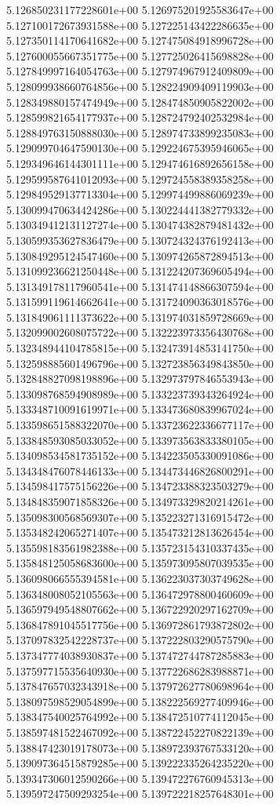 5.126850231177228601e+00
5.126975201925583647e+00
5.127100172673931588e+00
5.127225143422286635e+00
5.127350114170641682e+00
5.127475084918996728e+00
5.127600055667351775e+00
5.127725026415698828e+00
5.127849997164054763e+00
5.127974967912409809e+00
5.128099938660764856e+00
5.128224909409119903e+00
5.128349880157474949e+00
5.128474850905822002e+00
5.128599821654177937e+00
5.128724792402532984e+00
5.128849763150888030e+00
5.128974733899235083e+00
5.129099704647590130e+00
5.129224675395946065e+00
5.129349646144301111e+00
5.129474616892656158e+00
5.129599587641012093e+00
5.129724558389358258e+00
5.129849529137713304e+00
5.129974499886069239e+00
5.130099470634424286e+00
5.130224441382779332e+00
5.130349412131127274e+00
5.130474382879481432e+00
5.130599353627836479e+00
5.130724324376192413e+00
5.130849295124547460e+00
5.130974265872894513e+00
5.131099236621250448e+00
5.131224207369605494e+00
5.131349178117960541e+00
5.131474148866307594e+00
5.131599119614662641e+00
5.131724090363018576e+00
5.131849061111373622e+00
5.131974031859728669e+00
5.132099002608075722e+00
5.132223973356430768e+00
5.132348944104785815e+00
5.132473914853141750e+00
5.132598885601496796e+00
5.132723856349843850e+00
5.132848827098198896e+00
5.132973797846553943e+00
5.133098768594908989e+00
5.133223739343264924e+00
5.133348710091619971e+00
5.133473680839967024e+00
5.133598651588322070e+00
5.133723622336677117e+00
5.133848593085033052e+00
5.133973563833380105e+00
5.134098534581735152e+00
5.134223505330091086e+00
5.134348476078446133e+00
5.134473446826800291e+00
5.134598417575156226e+00
5.134723388323503279e+00
5.134848359071858326e+00
5.134973329820214261e+00
5.135098300568569307e+00
5.135223271316915472e+00
5.135348242065271407e+00
5.135473212813626454e+00
5.135598183561982388e+00
5.135723154310337435e+00
5.135848125058683600e+00
5.135973095807039535e+00
5.136098066555394581e+00
5.136223037303749628e+00
5.136348008052105563e+00
5.136472978800460609e+00
5.136597949548807662e+00
5.136722920297162709e+00
5.136847891045517756e+00
5.136972861793872802e+00
5.137097832542228737e+00
5.137222803290575790e+00
5.137347774038930837e+00
5.137472744787285883e+00
5.137597715535640930e+00
5.137722686283988871e+00
5.137847657032343918e+00
5.137972627780698964e+00
5.138097598529054899e+00
5.138222569277409946e+00
5.138347540025764992e+00
5.138472510774112045e+00
5.138597481522467092e+00
5.138722452270822139e+00
5.138847423019178073e+00
5.138972393767533120e+00
5.139097364515879285e+00
5.139222335264235220e+00
5.139347306012590266e+00
5.139472276760945313e+00
5.139597247509293254e+00
5.139722218257648301e+00
